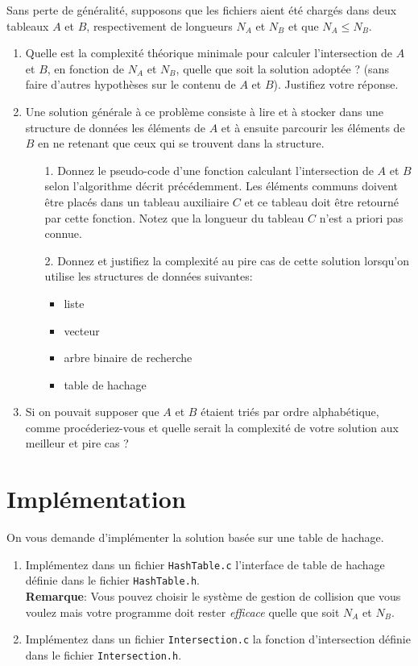 \documentclass[a4paper,10pt]{article}
\begin{document}
Sans perte de généralité, supposons que les fichiers aient été chargés
dans deux tableaux $A$ et $B$, respectivement de longueurs $N_A$ et $N_B$ et que
$N_A\leq N_B$.
\begin{enumerate}
\item Quelle est la complexité théorique minimale pour calculer l'intersection de $A$ et $B$, en fonction de $N_A$ et $N_B$, quelle que soit la
  solution adoptée ? (sans faire d'autres hypothèses sur le contenu
  de $A$ et $B$). Justifiez votre réponse.
\item Une solution générale à ce problème consiste à lire et à stocker
  dans une structure de données les éléments de $A$ et à
  ensuite parcourir les éléments de $B$ en ne retenant que ceux qui se trouvent dans la structure.

  \begin{enumerate}
    \item[1.] Donnez le pseudo-code d'une fonction calculant l'intersection de $A$ et $B$ selon l'algorithme décrit précédemment.
  Les éléments communs doivent être placés dans un tableau auxiliaire $C$ et
  ce tableau doit être retourné par cette fonction. Notez que la longueur du tableau $C$ n'est a priori pas connue.

    \item[2.] Donnez et justifiez la complexité au pire cas de cette solution lorsqu'on utilise les structures de données suivantes:
    \begin{itemize}
    \item liste
    \item vecteur
    \item arbre binaire de recherche
    \item table de hachage
    \end{itemize}
  \end{enumerate}
\item Si on pouvait supposer que $A$ et $B$ étaient
  triés par ordre alphabétique, comme procéderiez-vous et quelle
  serait la complexité de votre solution aux meilleur et pire cas ?
\end{enumerate}

\section{Implémentation}

On vous demande d'implémenter la solution basée sur une table de
hachage.

\begin{enumerate}
\item Implémentez dans un fichier \texttt{HashTable.c} l'interface de table de hachage définie dans le fichier \texttt{HashTable.h}.\\
  \textbf{Remarque}: Vous pouvez choisir le système de gestion de collision
  que vous voulez mais votre programme doit rester {\it efficace} quelle
  que soit $N_A$ et $N_B$.
\item Implémentez dans un fichier \texttt{Intersection.c} la fonction d'intersection définie dans le fichier \texttt{Intersection.h}.
\end{enumerate}
\end{document}

